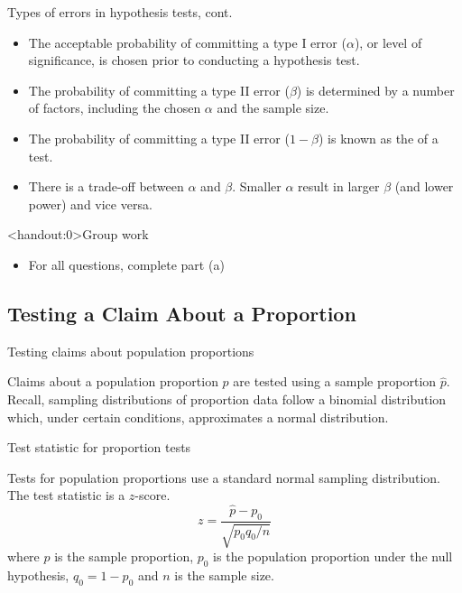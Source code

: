 \documentclass[xcolor=table]{beamer}
\begin{document}
\begin{frame}{Types of errors in hypothesis tests, cont.}
\begin{block}{}
\large
\begin{itemize}
\item The acceptable probability of committing a type I error ($\alpha$), or level of significance,  is chosen prior to conducting a hypothesis test.
\pause\item The probability of committing a type II error ($\beta$) is determined by a number of factors, including the chosen $\alpha$ and the sample size.
\pause\item The probability of  committing a type II error ($1-\beta$) is known as the  of a test.
\pause\item There is a trade-off between $\alpha$ and $\beta$. Smaller $\alpha$ result in larger $\beta$ (and lower power) and vice versa.
\end{itemize}
\end{block}
\end{frame}

\begin{frame}<handout:0>{Group work}
\begin{block}{}
\large
\begin{itemize}
\item For all questions, complete part (a)
\end{itemize}
\end{block}
\end{frame}


\subsection{Testing a Claim About a Proportion}

\begin{frame}{Testing claims about population proportions}
\begin{block}{}
\large
Claims about a population proportion $p$ are tested using a sample proportion $\hat p$.\\
\medskip
Recall, sampling distributions of proportion data follow a binomial distribution which, under certain conditions, approximates a normal distribution.\\
\end{block}
\end{frame}

\begin{frame}{Test statistic for proportion tests}
\begin{block}{}
\large
Tests for population proportions use a standard normal sampling distribution. The test statistic is a $z$-score.
\[z = \frac {\hat p - p_0}{\sqrt{p_0q_0/n}}\]
where $\hat p$ is the sample proportion, $p_0$ is the population proportion under the null hypothesis, $q_0=1-p_0$ and $n$ is the sample size.
\end{block}

\end{frame}
\end{document}
